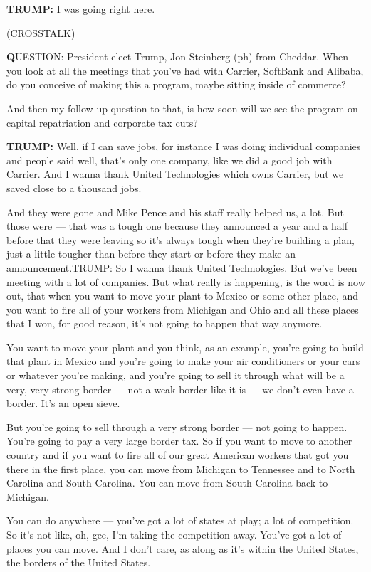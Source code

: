 \textbf{TRUMP:} I was going right here.

(CROSSTALK)

\textbf{Q}UESTION: President-elect Trump, Jon Steinberg (ph) from
Cheddar. When you look at all the meetings that you've had with Carrier,
SoftBank and Alibaba, do you conceive of making this a program, maybe
sitting inside of commerce?

And then my follow-up question to that, is how soon will we see the
program on capital repatriation and corporate tax cuts?

\textbf{TRUMP:} Well, if I can save jobs, for instance I was doing
individual companies and people said well, that's only one company, like
we did a good job with Carrier. And I wanna thank United Technologies
which owns Carrier, but we saved close to a thousand jobs.

And they were gone and Mike Pence and his staff really helped us, a lot.
But those were --- that was a tough one because they announced a year
and a half before that they were leaving so it's always tough when
they're building a plan, just a little tougher than before they start or
before they make an announcement.TRUMP: So I wanna thank United
Technologies. But we've been meeting with a lot of companies. But what
really is happening, is the word is now out, that when you want to move
your plant to Mexico or some other place, and you want to fire all of
your workers from Michigan and Ohio and all these places that I won, for
good reason, it's not going to happen that way anymore.

You want to move your plant and you think, as an example, you're going
to build that plant in Mexico and you're going to make your air
conditioners or your cars or whatever you're making, and you're going to
sell it through what will be a very, very strong border --- not a weak
border like it is --- we don't even have a border. It's an open sieve.

But you're going to sell through a very strong border --- not going to
happen. You're going to pay a very large border tax. So if you want to
move to another country and if you want to fire all of our great
American workers that got you there in the first place, you can move
from Michigan to Tennessee and to North Carolina and South Carolina. You
can move from South Carolina back to Michigan.

You can do anywhere --- you've got a lot of states at play; a lot of
competition. So it's not like, oh, gee, I'm taking the competition away.
You've got a lot of places you can move. And I don't care, as along as
it's within the United States, the borders of the United States.

